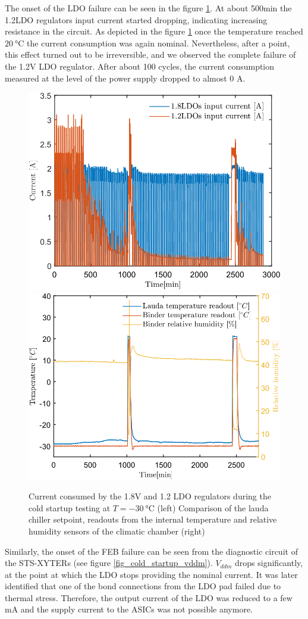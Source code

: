 The onset of the \gls{LDO} failure can be seen in the figure \ref{fig_cold_startup}. At about 500min the 1.2LDO regulators input current started dropping, indicating increasing resistance in the circuit. As depicted in the figure \ref{fig_cold_startup} once the temperature reached $\SI{20}{\celsius}$ the current consumption was again nominal. Nevertheless, after a point, this effect turned out to be irreversible, and we observed the complete failure of the 1.2V \gls{LDO} regulator. After about 100 cycles, the current consumption measured at the level of the power supply dropped to almost 0 A. 
\begin{figure}[!h]
\centering
\includegraphics[width=0.46\columnwidth]{Chapter4/images/currents_long.png}
\includegraphics[width=0.48\columnwidth]{Chapter4/images/cycling.png}
\caption{Current consumed by the 1.8V and 1.2 \gls{LDO} regulators during the cold startup testing at $T = \SI{-30}{\celsius}$ (left)
Comparison of the lauda chiller setpoint, readouts from the internal temperature and relative humidity sensors of the climatic chamber (right)}
\label{fig_cold_startup}
\end{figure}

Similarly, the onset of the \gls{FEB} failure can be seen from the diagnostic circuit of the STS-XYTERs (see figure \ref{fig_cold_startup_vddm}). $V_{ddm}$ drops significantly, at the point at which the \gls{LDO} stops providing the nominal current. It was later identified that one of the bond connections from the \gls{LDO} pad failed due to thermal stress. Therefore, the output current of the \gls{LDO} was reduced to a few mA and the supply current to the \glspl{ASIC} was not possible anymore.


